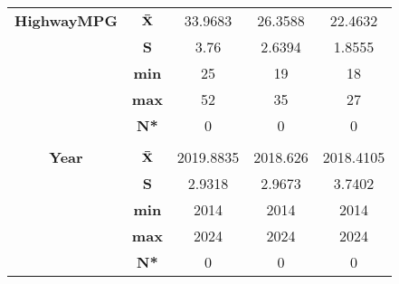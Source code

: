 \begin{center}
\begin{tabular}{|c|c||c|c|c|}
{\bf HighwayMPG} &  $\bf \bar{X}$ & 33.9683 & 26.3588 & 22.4632 \\
\cline{2-5}
 & {\bf  S} & 3.76 & 2.6394 & 1.8555 \\
\cline{2-5}
 & {\bf  min} & 25 & 19 & 18 \\
\cline{2-5}
 & {\bf  max} & 52 & 35 & 27 \\
\cline{2-5}
 & {\bf  N*} & 0 & 0 & 0 \\
\cline{2-5}
\hline
\hline
 &  &  &  & \\  [-2.4ex]
{\bf Year} &  $\bf \bar{X}$ & 2019.8835 & 2018.626 & 2018.4105 \\
\cline{2-5}
 & {\bf  S} & 2.9318 & 2.9673 & 3.7402 \\
\cline{2-5}
 & {\bf  min} & 2014 & 2014 & 2014 \\
\cline{2-5}
 & {\bf  max} & 2024 & 2024 & 2024 \\
\cline{2-5}
 & {\bf  N*} & 0 & 0 & 0 \\
\cline{2-5}
\hline
\hline
\end{tabular}
\end{center}

